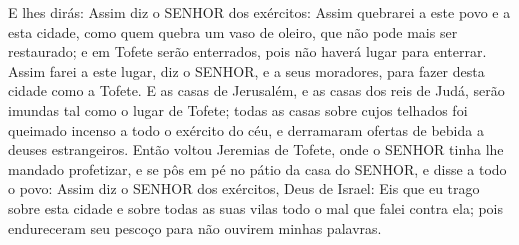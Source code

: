 {E lhes dirás: Assim diz o SENHOR dos exércitos: Assim quebrarei a este povo e a esta cidade, como quem quebra um vaso de oleiro, que não pode mais ser restaurado; e em Tofete serão enterrados, pois não haverá
{} lugar para enterrar.
Assim farei a este lugar, diz o SENHOR, e a seus moradores, para fazer desta cidade como a Tofete.
E as casas de Jerusalém, e as casas dos reis de Judá, serão imundas tal como o lugar de Tofete; todas as casas sobre cujos telhados foi queimado incenso a todo o exército do céu,
 e derramaram ofertas de bebida a deuses estrangeiros.
Então voltou Jeremias de Tofete, onde o SENHOR tinha lhe mandado profetizar, e se pôs em pé no pátio da casa do SENHOR, e disse a todo o povo:
Assim diz o SENHOR dos exércitos, Deus de Israel: Eis que eu trago sobre esta cidade e sobre todas as suas vilas todo o mal
 que falei contra ela; pois endureceram seu pescoço para não ouvirem minhas palavras.

\par }

